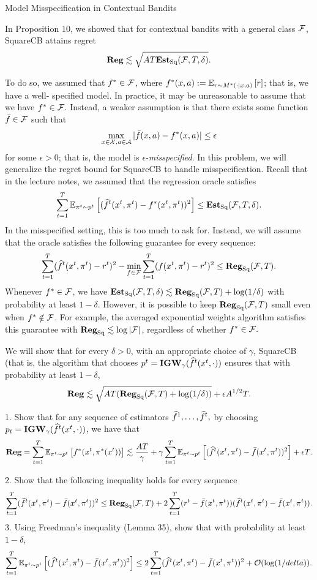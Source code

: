 \begin{exercise}[]{Model Misspecification in Contextual Bandits}
\end{exercise}
In Proposition 10, we showed that for contextual bandits with a general class $\F$,
 SquareCB attains regret
 \[ \Reg \lesssim \sqrt{AT \EstSq(\F,T,\delta)}.\]

 To do so, we assumed that $f^* \in \F$, where 
 $f^*(x,a) := \EEs{r}{r\sim M^*(\cdot|x,a)}$; that is, we have a well- specified model. 
 In practice, it may be unreasonable to assume that we have $f^* \in \F.$
 Instead, a weaker assumption is that there exists some function $\bar f \in \F$ such that
 \[ \max_{x \in \X, a \in \A} |\bar f(x,a)-f^*(x,a)|\leq \epsilon\]
 for some $\epsilon >0$; that is, the model is $\epsilon$-\textit{misspecified}. In this problem,
 we will generalize the regret bound for SquareCB to handle misspecification. Recall that in the lecture notes, we assumed
 that the regression oracle satisfies
 \[ \sum_{t=1}^T \EEs{(\wh f^t(x^t,\pi^t)-f^*(x^t,\pi^t))^2}{\pi^t \sim p^t}\leq \EstSq(\F,T,\delta).\]
 In the misspecified setting, this is too much to ask for. 
 Instead, we will assume that the oracle satisfies the following guarantee for every sequence:
\[ \sum_{t=1}^T(\wh f^t(x^t,\pi^t)-r^t)^2 -\min_{f\in \F}\sum_{t=1}^T(f(x^t,\pi^t)-r^t)^2\leq \Reg_{\text{Sq}}(\F,T).\]
Whenever $f^* \in \F$, we have $\EstSq(\F,T,\delta)\lesssim \Reg_{\text{Sq}}(\F,T)+ \log(1/\delta)$ with probability at least $1-\delta$.
However, it is possible to keep $\Reg_{\text{Sq}}(\F,T)$ small even when $f^* \notin \F$.
For example, the averaged exponential weights algorithm satisfies this guarantee with 
$\Reg_{\text{Sq}} \lesssim \log |\F|$, regardless of whether $f^* \in \F.$

We will show that for every $\delta > 0$, with an appropriate choice of $\gamma$, SquareCB (that is, the algorithm that chooses $p^t =\textbf{IGW}_\gamma(\wh f^t(x^t,\cdot))$ 
ensures that with probability at least $1-\delta$,
\[ \Reg \lesssim \sqrt{AT (\Reg_{\text{Sq}}(\F,T)+\log(1/\delta))} +\epsilon A^{1/2}T.\]

1.  Show that for any sequence of estimators 
$\wh f^1 ,\ldots,\wh f^t,$ by choosing $p_t = \textbf{IGW}_\gamma(\wh f^t(x^t , \cdot))$, we have that
\[\Reg= \sum_{t=1}^T \EEs{f^*(x^t,\pi^*(x^t))}{\pi^t\sim p^t} \lesssim \frac{AT}{\gamma}+ \gamma \sum_{t=1}^T
\EEs{(\wh f^t(x^t,\pi^t)-\bar f(x^t,\pi^t))^2}{\pi^t \sim p^t}+\epsilon T.\]

2. Show that the following inequality holds for every sequence
\[ \sum_{t=1}^T(\wh f^t(x^t,\pi^t)-\bar f(x^t,\pi^t))^2\leq \Reg_{\text{Sq}}(\F,T)+2\sum_{t=1}^T(r^t-\bar f(x^t,\pi^t))(\wh f^t(x^t,\pi^t)-\bar f(x^t,\pi^t)).\]
3. Using Freedman’s inequality (Lemma 35), show that with probability at least $1-\delta$,
\[\sum_{t=1}^T \EEs{(\wh f^t (x^t,\pi^t)-\bar f(x^t,\pi^t))^2}{\pi^t \sim p^t} \leq 2\sum_{t=1}^T(\wh f^t (x^t, \pi^t)-\bar f (x^t,\pi^t))^2 + \OO(\log(1/delta)).\]

